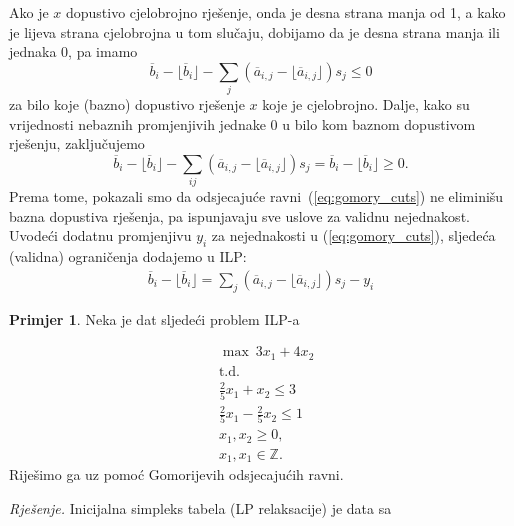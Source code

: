 \documentclass[b5paper, utf8, 11pt, colorlinks]{book}
\theoremstyle{definition}
\newtheorem{primjer}{Primjer}[chapter]
\begin{document}
Ako je $x$ dopustivo cjelobrojno rješenje, onda je desna strana manja od 1, a kako je lijeva strana cjelobrojna u tom slučaju, dobijamo da je desna strana manja ili jednaka 0, pa imamo
\begin{equation}\label{eq:gomory_cuts}
    \overline{b}_i - \lfloor \overline{b}_i  \rfloor    - \sum_{j} (\overline{a}_{i,j} - \lfloor \overline{a}_{i,j} \rfloor) s_j \leq 0
\end{equation}
za bilo koje (bazno) dopustivo rješenje $x$ koje je cjelobrojno. Dalje, kako su vrijednosti nebaznih promjenjivih jednake 0 u bilo kom baznom dopustivom rješenju, zaključujemo
$$ \overline{b}_i - \lfloor \overline{b}_i  \rfloor    - \sum_{ij} (\overline{a}_{i,j} - \lfloor \overline{a}_{i,j} \rfloor) s_j = \overline{b}_i - \lfloor \overline{b}_i \rfloor  \geq 0.$$
Prema tome, pokazali smo da odsjecajuće ravni~(\ref{eq:gomory_cuts}) ne eliminišu bazna dopustiva rješenja, pa ispunjavaju sve uslove za validnu nejednakost. Uvodeći dodatnu promjenjivu $y_i$ za nejednakosti u (\ref{eq:gomory_cuts}), sljedeća (validna) ograničenja dodajemo u ILP:
\begin{align}\label{gomory_cplex}
       \overline{b}_i - \lfloor \overline{b}_i \rfloor=   \sum_{j} (\overline{a}_{i,j} - \lfloor \overline{a}_{i,j} \rfloor)s_j - y_i 
\end{align}

\begin{primjer} Neka je dat sljedeći problem ILP-a
	\end{primjer}
\begin{align*}
    &\max\ 3 x_1 + 4 x_2 \\
    & \mbox{t.d. }  \\
    & \displaystyle\frac{2}{5}x_1 + x_2 \leq 3 \\
    & \displaystyle\frac{2}{5}x_1 - \frac{2}{5}x_2 \leq 1 \\
    &x_1, x_2 \geq 0, \\
    &  x_1, x_1 \in \mathbb{Z}.
\end{align*}
Riješimo ga uz pomoć Gomorijevih odsjecajućih ravni. 

\emph{Rješenje.}
Inicijalna simpleks tabela (LP relaksacije) je data sa 
\end{document}
